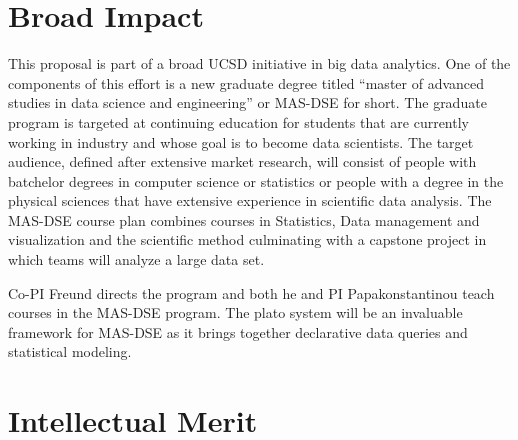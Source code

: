 \section{Broad Impact}
\label{sec:broad-impact}

This proposal is part of a broad UCSD initiative in big data
analytics. One of the components of this effort is a new graduate
degree titled ``master of advanced studies in data science and
engineering'' or MAS-DSE for short. The graduate program is targeted
at continuing education for students that are currently working in
industry and whose goal is to become data scientists. The target
audience, defined after extensive market research, will consist of
people with batchelor degrees in computer science or statistics or
people with a degree in the physical sciences that have extensive
experience in scientific data analysis. The MAS-DSE course plan
combines courses in Statistics, Data management and visualization and
the scientific method culminating with a capstone project in which
teams will analyze a large data set.

Co-PI Freund directs the program and both he and PI Papakonstantinou
teach courses in the MAS-DSE program. The plato system will be an
invaluable framework for MAS-DSE as it brings together declarative
data queries and statistical modeling.

\section{Intellectual Merit}
\label{sec:merit}

